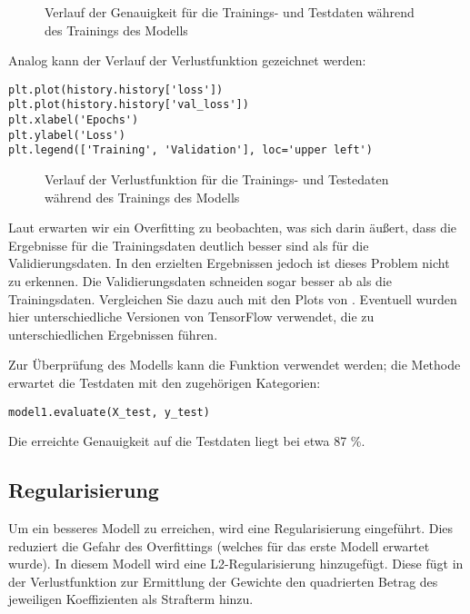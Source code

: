 \begin{figure}[H]
	\caption{Verlauf der Genauigkeit für die Trainings- und Testdaten während des Trainings des Modells}\label{TensorFlowIrisPlotHist1}
\end{figure}

Analog kann der Verlauf der  Verlustfunktion gezeichnet werden:

\begin{verbatim}
plt.plot(history.history['loss'])
plt.plot(history.history['val_loss'])
plt.xlabel('Epochs')
plt.ylabel('Loss')
plt.legend(['Training', 'Validation'], loc='upper left')
\end{verbatim}

\begin{figure}[H]
	\caption{Verlauf der Verlustfunktion für die Trainings- und Testedaten während des Trainings des Modells}\label{TensorFlowIrisPlotHist2}
\end{figure}

Laut \cite{KDnuggets.07.12.2020} erwarten wir ein Overfitting zu beobachten, was sich darin äußert, dass die Ergebnisse für die Trainingsdaten
deutlich besser sind als für die Validierungsdaten. In den erzielten Ergebnissen jedoch ist dieses Problem nicht zu erkennen. Die Validierungsdaten
schneiden sogar besser ab als die Trainingsdaten. Vergleichen Sie dazu auch mit den Plots von \cite{KDnuggets.07.12.2020}. Eventuell wurden hier
unterschiedliche Versionen von TensorFlow verwendet, die zu unterschiedlichen Ergebnissen führen.

Zur Überprüfung des Modells kann die Funktion   verwendet werden; die
Methode erwartet die Testdaten mit den zugehörigen Kategorien:

\begin{verbatim}
model1.evaluate(X_test, y_test)
\end{verbatim}

Die erreichte Genauigkeit auf die Testdaten liegt bei etwa 87 \%.


\subsection{Regularisierung}

Um ein besseres Modell zu erreichen, wird eine Regularisierung eingeführt. Dies reduziert die Gefahr des Overfittings
(welches für das erste Modell erwartet wurde). In diesem Modell wird eine L2-Regularisierung hinzugefügt. 
Diese fügt in der Verlustfunktion zur Ermittlung der Gewichte den quadrierten Betrag des jeweiligen Koeffizienten als Strafterm hinzu.  

